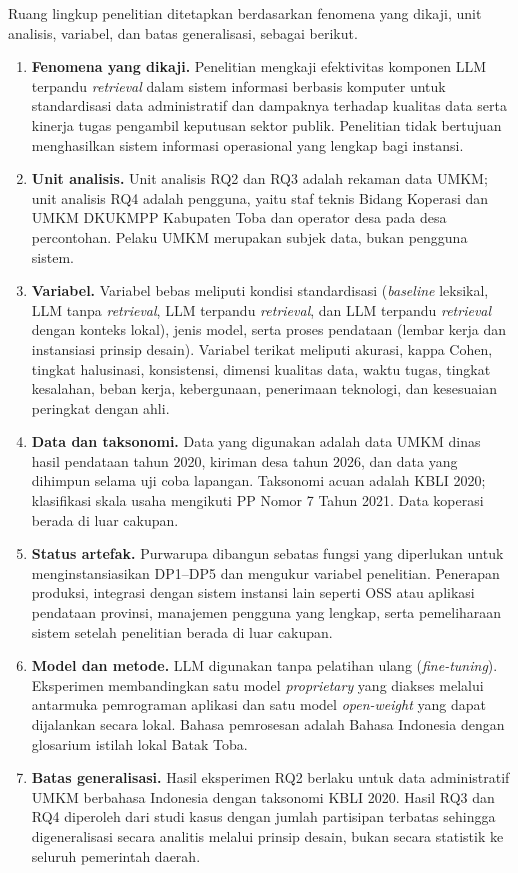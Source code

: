 \documentclass[12pt,a4paper]{report}
\begin{document}
Ruang lingkup penelitian ditetapkan berdasarkan fenomena yang dikaji, unit analisis, variabel, dan batas generalisasi, sebagai berikut.
\begin{enumerate}
  \item \textbf{Fenomena yang dikaji.} Penelitian mengkaji efektivitas komponen LLM terpandu \textit{retrieval} dalam sistem informasi berbasis komputer untuk standardisasi data administratif dan dampaknya terhadap kualitas data serta kinerja tugas pengambil keputusan sektor publik. Penelitian tidak bertujuan menghasilkan sistem informasi operasional yang lengkap bagi instansi.
  \item \textbf{Unit analisis.} Unit analisis RQ2 dan RQ3 adalah rekaman data UMKM; unit analisis RQ4 adalah pengguna, yaitu staf teknis Bidang Koperasi dan UMKM DKUKMPP Kabupaten Toba dan operator desa pada desa percontohan. Pelaku UMKM merupakan subjek data, bukan pengguna sistem.
  \item \textbf{Variabel.} Variabel bebas meliputi kondisi standardisasi (\textit{baseline} leksikal, LLM tanpa \textit{retrieval}, LLM terpandu \textit{retrieval}, dan LLM terpandu \textit{retrieval} dengan konteks lokal), jenis model, serta proses pendataan (lembar kerja dan instansiasi prinsip desain). Variabel terikat meliputi akurasi, kappa Cohen, tingkat halusinasi, konsistensi, dimensi kualitas data, waktu tugas, tingkat kesalahan, beban kerja, kebergunaan, penerimaan teknologi, dan kesesuaian peringkat dengan ahli.
  \item \textbf{Data dan taksonomi.} Data yang digunakan adalah data UMKM dinas hasil pendataan tahun 2020, kiriman desa tahun 2026, dan data yang dihimpun selama uji coba lapangan. Taksonomi acuan adalah KBLI 2020; klasifikasi skala usaha mengikuti PP Nomor 7 Tahun 2021. Data koperasi berada di luar cakupan.
  \item \textbf{Status artefak.} Purwarupa dibangun sebatas fungsi yang diperlukan untuk menginstansiasikan DP1--DP5 dan mengukur variabel penelitian. Penerapan produksi, integrasi dengan sistem instansi lain seperti OSS atau aplikasi pendataan provinsi, manajemen pengguna yang lengkap, serta pemeliharaan sistem setelah penelitian berada di luar cakupan.
  \item \textbf{Model dan metode.} LLM digunakan tanpa pelatihan ulang (\textit{fine-tuning}). Eksperimen membandingkan satu model \textit{proprietary} yang diakses melalui antarmuka pemrograman aplikasi dan satu model \textit{open-weight} yang dapat dijalankan secara lokal. Bahasa pemrosesan adalah Bahasa Indonesia dengan glosarium istilah lokal Batak Toba.
  \item \textbf{Batas generalisasi.} Hasil eksperimen RQ2 berlaku untuk data administratif UMKM berbahasa Indonesia dengan taksonomi KBLI 2020. Hasil RQ3 dan RQ4 diperoleh dari studi kasus dengan jumlah partisipan terbatas sehingga digeneralisasi secara analitis melalui prinsip desain, bukan secara statistik ke seluruh pemerintah daerah.
\end{enumerate}
\end{document}
